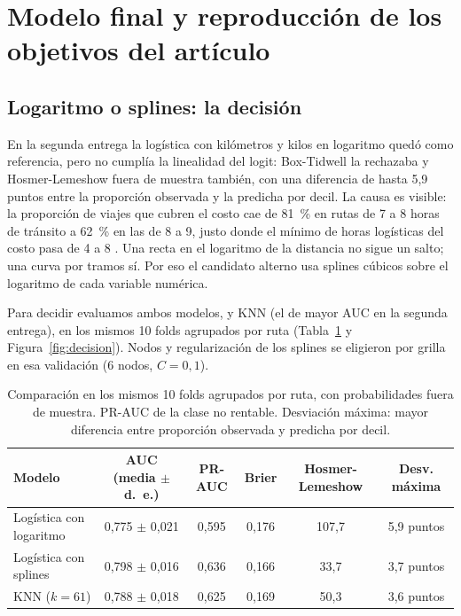 \documentclass[11pt,letterpaper]{article}
\begin{document}
\section{Modelo final y reproducción de los objetivos del artículo}

\subsection{Logaritmo o splines: la decisión}

En la segunda entrega la logística con kilómetros y kilos en logaritmo quedó como referencia, pero no cumplía la linealidad del logit: Box-Tidwell la rechazaba y Hosmer-Lemeshow fuera de muestra también, con una diferencia de hasta 5,9 puntos entre la proporción observada y la predicha por decil. La causa es visible: la proporción de viajes que cubren el costo cae de 81~\% en rutas de 7 a 8 horas de tránsito a 62~\% en las de 8 a 9, justo donde el mínimo de horas logísticas del costo pasa de 4 a 8 \cite{circular}. Una recta en el logaritmo de la distancia no sigue un salto; una curva por tramos sí. Por eso el candidato alterno usa splines cúbicos sobre el logaritmo de cada variable numérica.

Para decidir evaluamos ambos modelos, y KNN (el de mayor AUC en la segunda entrega), en los mismos 10 folds agrupados por ruta (Tabla~\ref{tab:decision} y Figura~\ref{fig:decision}). Nodos y regularización de los splines se eligieron por grilla en esa validación (6 nodos, $C = 0{,}1$).

\begin{table}[H]
\centering
\small
\caption{Comparación en los mismos 10 folds agrupados por ruta, con probabilidades fuera de muestra. PR-AUC de la clase no rentable. Desviación máxima: mayor diferencia entre proporción observada y predicha por decil.}
\label{tab:decision}
\begin{tabular}{lccccc}
\toprule
Modelo & AUC (media $\pm$ d.~e.) & PR-AUC & Brier & Hosmer-Lemeshow & Desv. máxima \\
\midrule
Logística con logaritmo & 0,775 $\pm$ 0,021 & 0,595 & 0,176 & 107,7 & 5,9 puntos \\
Logística con splines & 0,798 $\pm$ 0,016 & 0,636 & 0,166 & 33,7 & 3,7 puntos \\
KNN ($k = 61$) & 0,788 $\pm$ 0,018 & 0,625 & 0,169 & 50,3 & 3,6 puntos \\
\bottomrule
\end{tabular}
\end{table}
\end{document}
